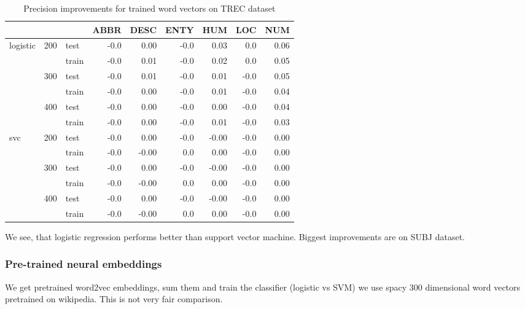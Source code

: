 \begin{table}[H]
\begin{center}

\begin{tabular}{lllrrrrrr}
\toprule
 & &&ABBR &DESC &ENTY &HUM &LOC &NUM \\
\midrule
logistic & 200 & test &-0.0 &0.00 &-0.0 & 0.03 &0.0 & 0.06 \\
 & & train &-0.0 &0.01 &-0.0 & 0.02 &0.0 & 0.05 \\
 & 300 & test &-0.0 &0.01 &-0.0 & 0.01 & -0.0 & 0.05 \\
 & & train &-0.0 &0.00 &-0.0 & 0.01 & -0.0 & 0.04 \\
 & 400 & test &-0.0 &0.00 &-0.0 & 0.00 & -0.0 & 0.04 \\
 & & train &-0.0 &0.00 &-0.0 & 0.01 & -0.0 & 0.03 \\
svc & 200 & test &-0.0 &0.00 &-0.0 &-0.00 & -0.0 & 0.00 \\
 & & train &-0.0 & -0.00 & 0.0 & 0.00 & -0.0 & 0.00 \\
 & 300 & test &-0.0 &0.00 &-0.0 &-0.00 & -0.0 & 0.00 \\
 & & train &-0.0 & -0.00 & 0.0 & 0.00 & -0.0 & 0.00 \\
 & 400 & test &-0.0 &0.00 &-0.0 &-0.00 & -0.0 & 0.00 \\
 & & train &-0.0 & -0.00 & 0.0 & 0.00 & -0.0 & 0.00 \\
\bottomrule
\end{tabular}

\caption[Precision improvements for trained word vectors on TREC dataset]{Precision improvements for trained word vectors on TREC dataset}
\label{tab:res:trainedwordvec:trec}
\end{center}
\end{table}


We see, that logistic regression performs better than support vector machine. Biggest improvements are on SUBJ dataset.


    \subsubsection{Pre-trained neural embeddings}    
    We get pretrained word2vec embeddings, sum them and train the classifier (logistic vs SVM)
    we use spacy $300$ dimensional word vectors pretrained on wikipedia. 
    This is not very fair comparison.
    

